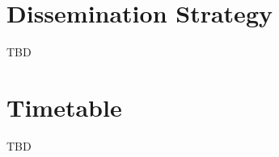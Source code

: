 \documentclass[review]{elsarticle}
\begin{document}
\section{Dissemination Strategy}
\label{sec:dissemination-strategy}
TBD

\section{Timetable}
\label{sec:timetable}
TBD


\end{document}

